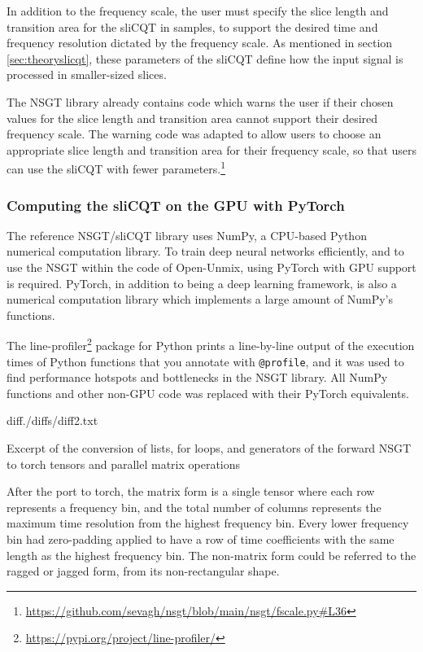 \documentclass[report.tex]{subfiles}
\begin{document}
In addition to the frequency scale, the user must specify the slice length and transition area for the sliCQT in samples, to support the desired time and frequency resolution dictated by the frequency scale. As mentioned in section \ref{sec:theoryslicqt}, these parameters of the sliCQT define how the input signal is processed in smaller-sized slices.

The NSGT library already contains code which warns the user if their chosen values for the slice length and transition area cannot support their desired frequency scale. The warning code was adapted to allow users to choose an appropriate slice length and transition area for their frequency scale, so that users can use the sliCQT with fewer parameters.\footnote{\url{https://github.com/sevagh/nsgt/blob/main/nsgt/fscale.py\#L36}}

\subsubsection{Computing the sliCQT on the GPU with PyTorch}
\label{sec:torchgpu}

The reference NSGT/sliCQT library uses NumPy, a CPU-based Python numerical computation library. To train deep neural networks efficiently, and to use the NSGT within the code of Open-Unmix, using PyTorch with GPU support is required. PyTorch, in addition to being a deep learning framework, is also a numerical computation library which implements a large amount of NumPy's functions.

The line-profiler\footnote{\url{https://pypi.org/project/line-profiler/}} package for Python prints a line-by-line output of the execution times of Python functions that you annotate with \Verb#@profile#, and it was used to find performance hotspots and bottlenecks in the NSGT library. All NumPy functions and other non-GPU code was replaced with their PyTorch equivalents.

\begin{listing}[ht]
  \centering
\begin{inputminted}[linenos,breaklines,frame=single,fontsize=\scriptsize]{diff}{./diffs/diff2.txt}
\end{inputminted}
  \caption{Excerpt of the conversion of lists, for loops, and generators of the forward NSGT to torch tensors and parallel matrix operations}
  \label{code:seconddiff}
\end{listing}

After the port to torch, the matrix form is a single tensor where each row represents a frequency bin, and the total number of columns represents the maximum time resolution from the highest frequency bin. Every lower frequency bin had zero-padding applied to have a row of time coefficients with the same length as the highest frequency bin. The non-matrix form could be referred to the ragged or jagged form, from its non-rectangular shape.
\end{document}
